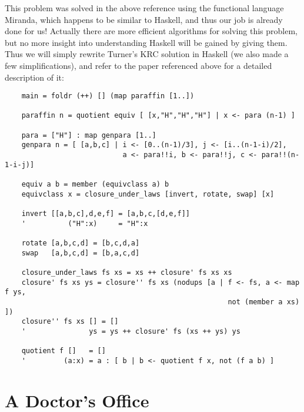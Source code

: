This problem was solved in the above reference using the functional
language Miranda, which happens to be similar to Haskell, and thus our
job is already done for us!  Actually there are more efficient
algorithms for solving this problem, but no more insight into
understanding Haskell will be gained by giving them.  Thus we will
simply rewrite Turner's KRC solution in Haskell (we also made a few
simplifications), and refer to the paper referenced above for a
detailed description of it:

\begin{verbatim}
    main = foldr (++) [] (map paraffin [1..])

    paraffin n = quotient equiv [ [x,"H","H","H"] | x <- para (n-1) ]

    para = ["H"] : map genpara [1..]
    genpara n = [ [a,b,c] | i <- [0..(n-1)/3], j <- [i..(n-1-i)/2],
                            a <- para!!i, b <- para!!j, c <- para!!(n-1-i-j)]

    equiv a b = member (equivclass a) b
    equivclass x = closure_under_laws [invert, rotate, swap] [x]

    invert [[a,b,c],d,e,f] = [a,b,c,[d,e,f]]
    '          ("H":x)     = "H":x

    rotate [a,b,c,d] = [b,c,d,a]
    swap   [a,b,c,d] = [b,a,c,d]

    closure_under_laws fs xs = xs ++ closure' fs xs xs
    closure' fs xs ys = closure'' fs xs (nodups [a | f <- fs, a <- map f ys,
                                                     not (member a xs) ])
    closure'' fs xs [] = []
    '               ys = ys ++ closure' fs (xs ++ ys) ys

    quotient f []   = []
    '         (a:x) = a : [ b | b <- quotient f x, not (f a b) ]
\end{verbatim}

\section{A Doctor's Office}

